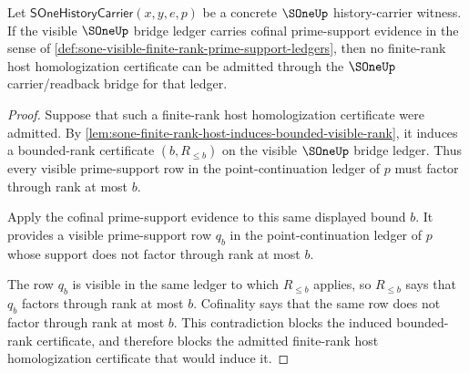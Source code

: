 \begin{theorem}
\label{thm:sone-finite-rank-host-homologization-obstruction}
Let $\mathsf{SOneHistoryCarrier}(x,y,e,p)$ be a concrete $\SOneUp$
history-carrier witness. If the visible $\SOneUp$ bridge ledger carries
cofinal prime-support evidence in the sense of
\autoref{def:sone-visible-finite-rank-prime-support-ledgers}, then no
finite-rank host homologization certificate can be admitted through the
$\SOneUp$ carrier/readback bridge for that ledger.
\end{theorem}
\begin{proof}
Suppose that such a finite-rank host homologization certificate were admitted.
By \autoref{lem:sone-finite-rank-host-induces-bounded-visible-rank}, it induces
a bounded-rank certificate $(b,R_{\le b})$ on the visible $\SOneUp$ bridge
ledger. Thus every visible prime-support row in the point-continuation ledger
of $p$ must factor through rank at most $b$.

Apply the cofinal prime-support evidence to this same displayed bound $b$. It
provides a visible prime-support row $q_b$ in the point-continuation ledger of
$p$ whose support does not factor through rank at most $b$.

The row $q_b$ is visible in the same ledger to which $R_{\le b}$ applies, so
$R_{\le b}$ says that $q_b$ factors through rank at most $b$. Cofinality says
that the same row does not factor through rank at most $b$. This contradiction
blocks the induced bounded-rank certificate, and therefore blocks the admitted
finite-rank host homologization certificate that would induce it.
\end{proof}
